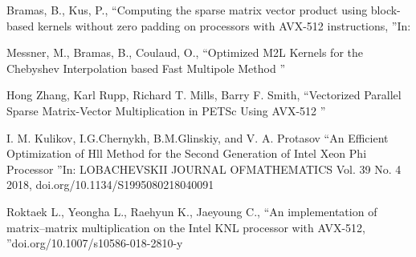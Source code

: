 \documentclass[
11pt,%
tightenlines,%
twoside,%
onecolumn,%
nofloats,%
nobibnotes,%
nofootinbib,%
superscriptaddress,%
noshowpacs,%
centertags]%
{revtex4}
\begin{document}
\begin{thebibliography}{99}
Bramas, B., Kus, P., \textquotedblleft Computing the sparse matrix vector product using block-based kernels without zero padding on processors with AVX-512 instructions, \textquotedblright In:

Messner, M., Bramas, B., Coulaud, O., \textquotedblleft Optimized M2L Kernels for the Chebyshev Interpolation based Fast Multipole Method \textquotedblright

Hong Zhang, Karl Rupp, Richard T. Mills, Barry F. Smith, \textquotedblleft Vectorized Parallel Sparse Matrix-Vector Multiplication in PETSc Using AVX-512 \textquotedblright

I. M. Kulikov, I.G.Chernykh, B.M.Glinskiy, and V. A. Protasov \textquotedblleft An Efficient Optimization of Hll Method for the Second Generation of Intel Xeon Phi Processor \textquotedblright In: LOBACHEVSKII JOURNAL OFMATHEMATICS Vol. 39 No. 4 2018, doi.org/10.1134/S1995080218040091

Roktaek L., Yeongha L., Raehyun K., Jaeyoung C., \textquotedblleft An implementation of matrix–matrix multiplication on the Intel KNL processor with AVX-512, \textquotedblright  doi.org/10.1007/s10586-018-2810-y




\end{thebibliography}
\end{document}
